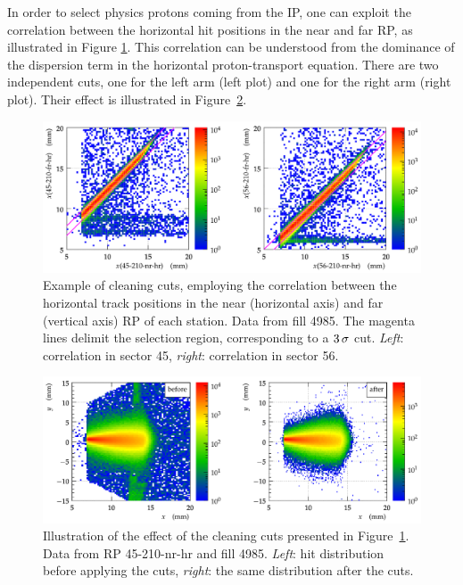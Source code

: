 \documentclass[TOTEM]{cern/cernphprep}
\def\un#1{\,{\rm #1}}
\begin{document}
In order to select physics protons coming from the IP, one can exploit the correlation between the horizontal hit positions in the near and far RP, as illustrated in Figure \ref{fig:hor_cuts}. This correlation can be understood from the dominance of the dispersion term in the horizontal proton-transport equation. There are two independent cuts, one for the left arm (left plot) and one for the right arm (right plot). Their effect is illustrated in Figure~\ref{fig:hor_cuts_effect}.

\begin{figure}[h!]
\begin{center}
\includegraphics[width=0.8\hsize]{fig/physics_fills/hor_cuts.pdf}
\caption{%
Example of cleaning cuts, employing the correlation between the horizontal track positions in the near (horizontal axis) and far (vertical axis) RP of each station. Data from fill 4985. The magenta lines delimit the selection region, corresponding to a $3\un{\sigma}$ cut. {\it Left}: correlation in sector 45, {\it right}: correlation in sector 56.
}
\label{fig:hor_cuts}
\end{center}
\end{figure}


\begin{figure}[h!]
\begin{center}
\includegraphics[width=0.8\hsize]{fig/physics_fills/hor_cuts_effect_cmp.pdf}
\caption{%
Illustration of the effect of the cleaning cuts presented in Figure~\ref{fig:hor_cuts}. Data from RP 45-210-nr-hr and fill 4985. {\it Left}: hit distribution before applying the cuts, {\it right}: the same distribution after the cuts.
}
\label{fig:hor_cuts_effect}
\end{center}
\end{figure}
\end{document}
